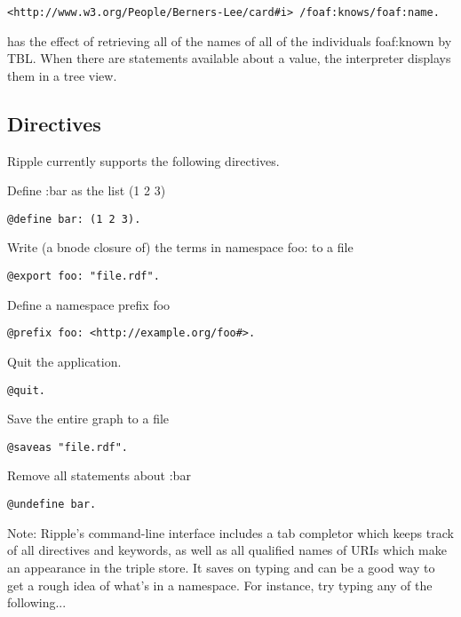 \documentclass[runningheads]{llncs}
\begin{document}
\begin{verbatim}
<http://www.w3.org/People/Berners-Lee/card#i> /foaf:knows/foaf:name.
\end{verbatim}

has the effect of retrieving all of the names of all of the individuals
foaf:known by TBL.  When there are statements available about a value, the
interpreter displays them in a tree view.


\subsection{Directives}

Ripple currently supports the following directives.
\newline

Define :bar as the list (1 2 3)

\begin{verbatim}
@define bar: (1 2 3).
\end{verbatim}

Write (a bnode closure of) the terms in namespace foo: to a file

\begin{verbatim}
@export foo: "file.rdf".
\end{verbatim}

Define a namespace prefix foo

\begin{verbatim}
@prefix foo: <http://example.org/foo#>.
\end{verbatim}

Quit the application.

\begin{verbatim}
@quit.
\end{verbatim}

Save the entire graph to a file

\begin{verbatim}
@saveas "file.rdf".
\end{verbatim}

Remove all statements about :bar

\begin{verbatim}
@undefine bar.
\end{verbatim}

Note: Ripple's command-line interface includes a tab completor which keeps track of all directives and keywords, as well as all qualified names of URIs which make an appearance in the triple store.  It saves on typing and can be a good way to get a rough idea of what's in a namespace.  For instance, try typing any of the following...
\end{document}
